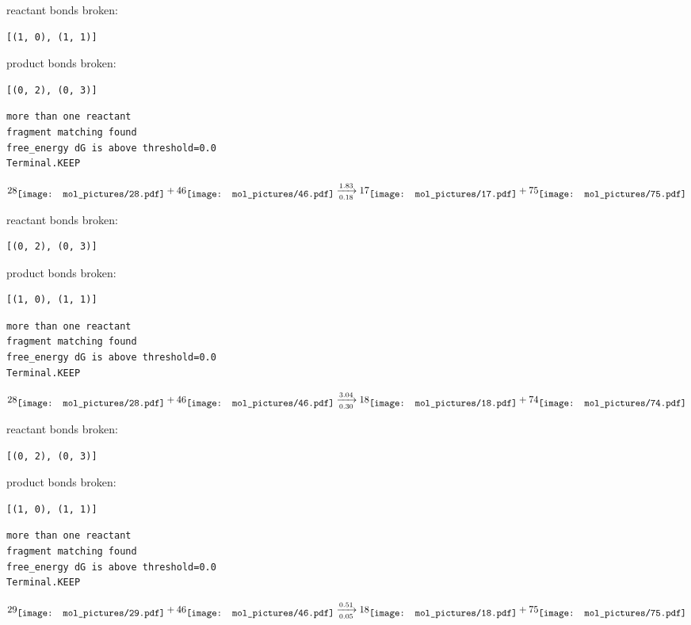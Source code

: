 \documentclass{article}
\begin{document}
reactant bonds broken:\begin{verbatim}
[(1, 0), (1, 1)]
\end{verbatim}
product bonds broken:\begin{verbatim}
[(0, 2), (0, 3)]
\end{verbatim}




\vspace{1cm}
\begin{verbatim}
more than one reactant
fragment matching found
free_energy dG is above threshold=0.0
Terminal.KEEP
\end{verbatim}
$$
28
\raisebox{-.5\height}{\texttt{[image: mol\_pictures/28.pdf]}}
+
46
\raisebox{-.5\height}{\texttt{[image: mol\_pictures/46.pdf]}}
\xrightarrow[0.18]{1.83}
17
\raisebox{-.5\height}{\texttt{[image: mol\_pictures/17.pdf]}}
+
75
\raisebox{-.5\height}{\texttt{[image: mol\_pictures/75.pdf]}}
$$


reactant bonds broken:\begin{verbatim}
[(0, 2), (0, 3)]
\end{verbatim}
product bonds broken:\begin{verbatim}
[(1, 0), (1, 1)]
\end{verbatim}




\vspace{1cm}
\begin{verbatim}
more than one reactant
fragment matching found
free_energy dG is above threshold=0.0
Terminal.KEEP
\end{verbatim}
$$
28
\raisebox{-.5\height}{\texttt{[image: mol\_pictures/28.pdf]}}
+
46
\raisebox{-.5\height}{\texttt{[image: mol\_pictures/46.pdf]}}
\xrightarrow[0.30]{3.04}
18
\raisebox{-.5\height}{\texttt{[image: mol\_pictures/18.pdf]}}
+
74
\raisebox{-.5\height}{\texttt{[image: mol\_pictures/74.pdf]}}
$$


reactant bonds broken:\begin{verbatim}
[(0, 2), (0, 3)]
\end{verbatim}
product bonds broken:\begin{verbatim}
[(1, 0), (1, 1)]
\end{verbatim}




\vspace{1cm}
\begin{verbatim}
more than one reactant
fragment matching found
free_energy dG is above threshold=0.0
Terminal.KEEP
\end{verbatim}
$$
29
\raisebox{-.5\height}{\texttt{[image: mol\_pictures/29.pdf]}}
+
46
\raisebox{-.5\height}{\texttt{[image: mol\_pictures/46.pdf]}}
\xrightarrow[0.05]{0.51}
18
\raisebox{-.5\height}{\texttt{[image: mol\_pictures/18.pdf]}}
+
75
\raisebox{-.5\height}{\texttt{[image: mol\_pictures/75.pdf]}}
$$
\end{document}
